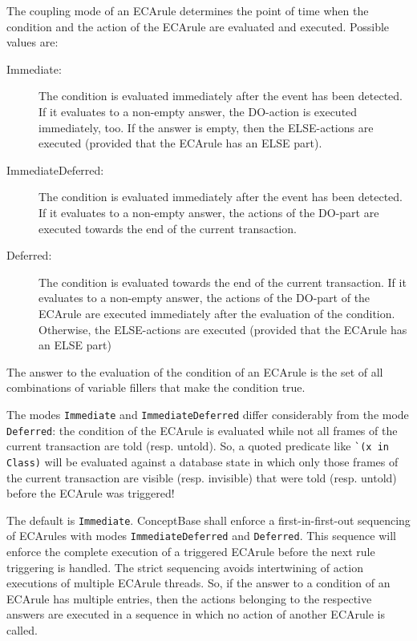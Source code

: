 The coupling mode of an ECArule determines the point of time 
when the condition
and the action of the ECArule are evaluated and executed.
Possible values are:
\begin{description}
\item[Immediate:] The condition is evaluated immediately after
the event has been detected. If it evaluates to a non-empty answer, the DO-action
is executed immediately, too. If the answer is empty, then the ELSE-actions are
executed (provided that the ECArule has an ELSE part). 

\item[ImmediateDeferred:] The condition is evaluated immediately after
the event has been detected. If it evaluates to a non-empty answer, the actions
of the DO-part are executed towards the end of the current transaction.

\item[Deferred:] The condition is evaluated towards the end
of the current transaction. If it evaluates to a non-empty answer, the 
actions of the DO-part of the ECArule
are executed immediately after the evaluation of the condition. Otherwise,
the ELSE-actions are executed (provided that the ECArule has an ELSE part)
\end{description}

The answer to the evaluation of the condition of an ECArule is
the set of all combinations of variable fillers that make the condition true.


The modes {\tt Immediate} and {\tt Immediate\-Deferred} differ considerably from
the mode {\tt Deferred}: the condition of the ECArule is evaluated
while not all frames of the current transaction are told (resp. untold). 
So, a quoted predicate like \verb+`(x in Class)+ will be evaluated
against a database state in which only those frames of the current transaction
are visible (resp. invisible) that were told (resp. untold) before
the ECArule was triggered!


The default is {\tt Immediate}. ConceptBase shall enforce a first-in-first-out
sequencing of ECArules with modes {\tt ImmediateDeferred} and {\tt Deferred}.
This sequence will enforce the complete execution of a triggered ECArule
before the next rule triggering is handled. The strict sequencing avoids
intertwining of action executions of multiple ECArule threads. So, if
the answer to a condition of an ECArule has multiple entries, then the
actions belonging to the respective answers are executed in a sequence
in which no action of another ECArule is called.

